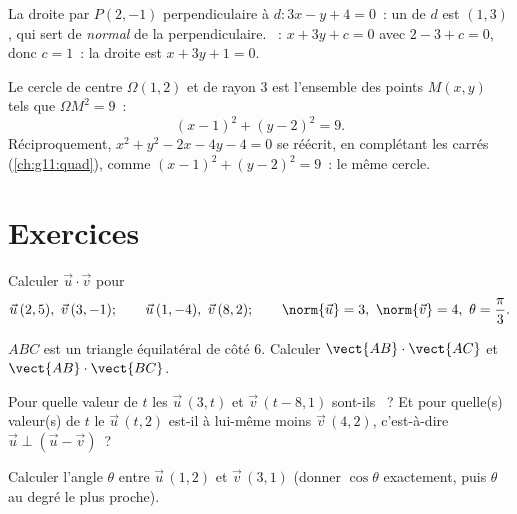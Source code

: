 \begin{example}\label{ex:g11:scal:perpline}
La droite par $P(2, -1)$ perpendiculaire à $d : 3x - y + 4 = 0$~: un
 de $d$ est $(1, 3)$, qui sert de 
\emph{normal} de la perpendiculaire. ~: $x + 3y + c = 0$ avec
$2 - 3 + c = 0$, donc $c = 1$~: la droite est $x + 3y + 1 = 0$.
\end{example}

\begin{example}\label{ex:g11:scal:circle}
Le cercle de centre $\Omega(1, 2)$ et de rayon $3$ est l'ensemble des
points $M(x,y)$ tels que $\Omega M^2 = 9$~:
\[
(x - 1)^2 + (y - 2)^2 = 9 .
\]
Réciproquement, $x^2 + y^2 - 2x - 4y - 4 = 0$ se réécrit, en complétant
les carrés (\cref{ch:g11:quad}), comme $(x-1)^2 + (y-2)^2 = 9$~: le même
cercle.
\end{example}

\section{Exercices}

\begin{exercise}[$\star$]\label{exo:g11:scal:1}
Calculer $\vec u \cdot \vec v$ pour
\[
\vec u\,(2, 5),\ \vec v\,(3, -1); \qquad
\vec u\,(1, -4),\ \vec v\,(8, 2); \qquad
\norm{\vec u} = 3,\ \norm{\vec v} = 4,\ \theta = \frac{\pi}{3} .
\]
\end{exercise}

\begin{exercise}[$\star$]\label{exo:g11:scal:2}
$ABC$ est un triangle équilatéral de côté $6$. Calculer
$\vect{AB} \cdot \vect{AC}$ et $\vect{AB} \cdot \vect{BC}$.
\end{exercise}

\begin{exercise}[$\star$]\label{exo:g11:scal:3}
Pour quelle valeur de $t$ les  $\vec u\,(3, t)$ et
$\vec v\,(t - 8, 1)$ sont-ils ~? Et pour quelle(s) valeur(s)
de $t$ le  $\vec u\,(t, 2)$ est-il  à lui-même moins
$\vec v\,(4, 2)$, c'est-à-dire $\vec u \perp (\vec u - \vec v)$~?
\end{exercise}

\begin{exercise}[$\star$]\label{exo:g11:scal:4}
Calculer l'angle $\theta$ entre $\vec u\,(1, 2)$ et $\vec v\,(3, 1)$
(donner $\cos\theta$ exactement, puis $\theta$ au degré le plus proche).
\end{exercise}

